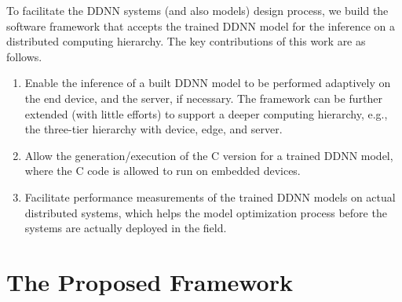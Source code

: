 \documentclass[conference]{IEEEtran}
\begin{document}
To facilitate the DDNN systems (and also models) design process, we build the software framework that accepts the trained DDNN model for the inference on a distributed computing hierarchy. The key contributions of this work are as follows.
\begin{enumerate}
  \item Enable the inference of a built DDNN model to be performed adaptively on the end device, and the server, if necessary. The framework can be further extended (with little efforts) to support a deeper computing hierarchy, e.g., the three-tier hierarchy with device, edge, and server.
  \item Allow the generation/execution of the C version for a trained DDNN model, where the C code is allowed to run on embedded devices. %
  \item Facilitate performance measurements of the trained DDNN models on actual distributed systems, which helps the model optimization process before the systems are actually deployed in the field.
\end{enumerate}

\section{The Proposed Framework}
\label{sec:framework}
\end{document}
